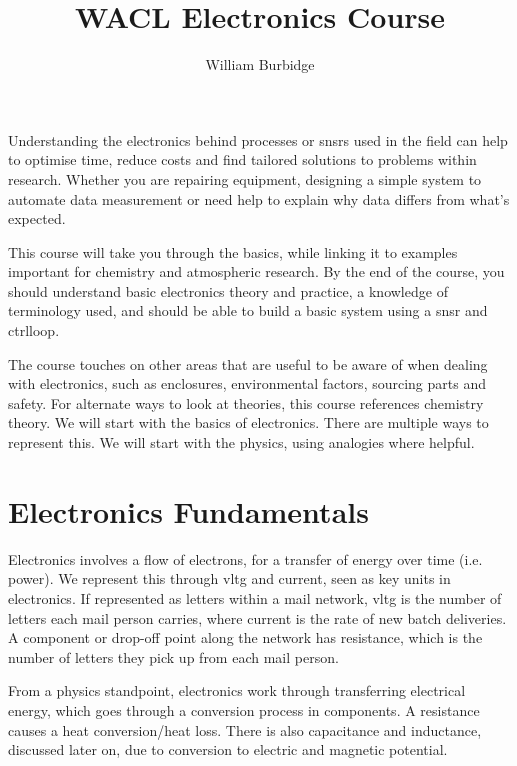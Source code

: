 \documentclass[a4paper,11pt]{report}
\title{WACL Electronics Course}
\author{William Burbidge}
\begin{document}
\maketitle

\tableofcontents

\doublespacing

\pagebreak

Understanding the electronics behind processes or \gls{snsr}s used in the field can help to optimise time, reduce costs and find tailored solutions to problems within research. Whether you are repairing equipment, designing a simple system to automate data measurement or need help to explain why data differs from what's expected.

This course will take you through the basics, while linking it to examples important for chemistry and atmospheric research. By the end of the course, you should understand basic electronics theory and practice, a knowledge of terminology used, and should be able to build a basic system using a \gls{snsr} and \gls{ctrlloop}.

The course touches on other areas that are useful to be aware of when dealing with electronics, such as enclosures, environmental factors, sourcing parts and safety. For alternate ways to look at theories, this course references chemistry theory. We will start with the basics of electronics. There are multiple ways to represent this. We will start with the physics, using analogies where helpful.

\section{Electronics Fundamentals}

Electronics involves a flow of electrons, for a transfer of energy over time (i.e. power). We represent this through \gls{vltg} and current, seen as key units in electronics. If represented as letters within a mail network, \gls{vltg} is the number of letters each mail person carries, where current is the rate of new batch deliveries. A component or drop-off point along the network has resistance, which is the number of letters they pick up from each mail person.

From a physics standpoint, electronics work through transferring electrical energy, which goes through a conversion process in components. A resistance causes a heat conversion/heat loss. There is also capacitance and inductance, discussed later on, due to conversion to electric and magnetic potential.
\end{document}
